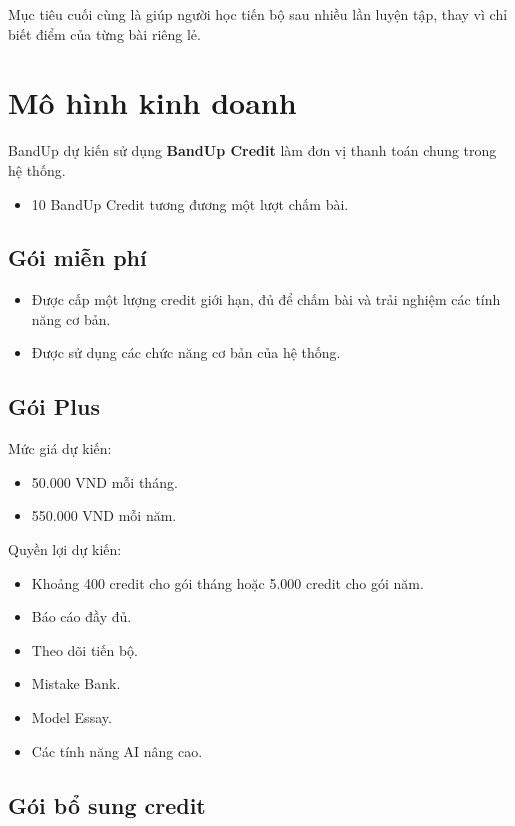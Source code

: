 \documentclass[12pt,a4paper]{article}
\begin{document}
Mục tiêu cuối cùng là giúp người học tiến bộ sau nhiều lần luyện tập, thay vì chỉ biết điểm của từng bài riêng lẻ.

\section{Mô hình kinh doanh}

BandUp dự kiến sử dụng \textbf{BandUp Credit} làm đơn vị thanh toán chung trong hệ thống.

\begin{itemize}
  \item 10 BandUp Credit tương đương một lượt chấm bài.
\end{itemize}

\subsection{Gói miễn phí}

\begin{itemize}
  \item Được cấp một lượng credit giới hạn, đủ để chấm bài và trải nghiệm các tính năng cơ bản.
  \item Được sử dụng các chức năng cơ bản của hệ thống.
\end{itemize}

\subsection{Gói Plus}

Mức giá dự kiến:

\begin{itemize}
  \item 50.000 VND mỗi tháng.
  \item 550.000 VND mỗi năm.
\end{itemize}

Quyền lợi dự kiến:

\begin{itemize}
  \item Khoảng 400 credit cho gói tháng hoặc 5.000 credit cho gói năm.
  \item Báo cáo đầy đủ.
  \item Theo dõi tiến bộ.
  \item Mistake Bank.
  \item Model Essay.
  \item Các tính năng AI nâng cao.
\end{itemize}

\subsection{Gói bổ sung credit}
\end{document}
